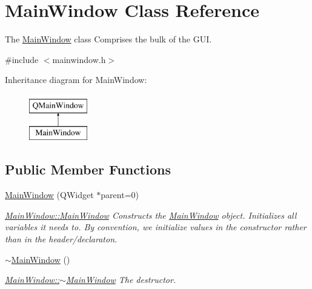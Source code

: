 \hypertarget{class_main_window}{}\section{Main\+Window Class Reference}
\label{class_main_window}


The \hyperlink{class_main_window}{Main\+Window} class Comprises the bulk of the G\+UI.  




{\ttfamily \#include $<$mainwindow.\+h$>$}

Inheritance diagram for Main\+Window\+:\begin{figure}[H]
\begin{center}
\leavevmode
\includegraphics[height=2.000000cm]{class_main_window}
\end{center}
\end{figure}
\subsection*{Public Member Functions}
\begin{DoxyCompactItemize}
\item 
\hyperlink{class_main_window_a8b244be8b7b7db1b08de2a2acb9409db}{Main\+Window} (Q\+Widget $\ast$parent=0)
\begin{DoxyCompactList}\small\item\em \hyperlink{class_main_window_a8b244be8b7b7db1b08de2a2acb9409db}{Main\+Window\+::\+Main\+Window} Constructs the \hyperlink{class_main_window}{Main\+Window} object. Initializes all variables it needs to. By convention, we initialize values in the constructor rather than in the header/declaraton. \end{DoxyCompactList}\item 
\hyperlink{class_main_window_ae98d00a93bc118200eeef9f9bba1dba7}{$\sim$\+Main\+Window} ()
\begin{DoxyCompactList}\small\item\em \hyperlink{class_main_window_ae98d00a93bc118200eeef9f9bba1dba7}{Main\+Window\+::$\sim$\+Main\+Window} The destructor. \end{DoxyCompactList}\end{DoxyCompactItemize}
